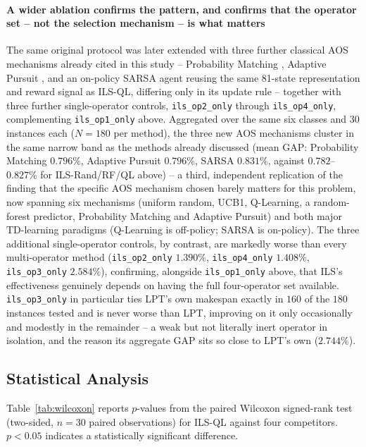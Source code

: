 \documentclass[final,3p,times,11pt,authoryear]{elsarticle}
\begin{document}
\paragraph{A wider ablation confirms the pattern, and confirms that
the operator set -- not the selection mechanism -- is what matters}
The same original protocol was later extended with three further
classical AOS mechanisms already cited in this study -- Probability
Matching \citep{Davis1989}, Adaptive Pursuit \citep{Thierens2005}, and
an on-policy SARSA agent \citep{RummeryNiranjan1994} reusing the same
81-state representation and reward signal as ILS-QL, differing only
in its update rule -- together with three further single-operator
controls, \texttt{ils\_op2\_only} through \texttt{ils\_op4\_only},
complementing \texttt{ils\_op1\_only} above. Aggregated over the same
six classes and 30 instances each ($N=180$ per method), the three new
AOS mechanisms cluster in the same narrow band as the methods already
discussed (mean GAP: Probability Matching $0.796\%$, Adaptive Pursuit
$0.796\%$, SARSA $0.831\%$, against $0.782$--$0.827\%$ for
ILS-Rand/RF/QL above) -- a third, independent replication of the
finding that the specific AOS mechanism chosen barely matters for
this problem, now spanning six mechanisms (uniform random, UCB1,
Q-Learning, a random-forest predictor, Probability Matching and
Adaptive Pursuit) and both major TD-learning paradigms (Q-Learning is
off-policy; SARSA is on-policy). The three additional single-operator
controls, by contrast, are markedly worse than every multi-operator
method (\texttt{ils\_op2\_only} $1.390\%$, \texttt{ils\_op4\_only}
$1.408\%$, \texttt{ils\_op3\_only} $2.584\%$), confirming, alongside
\texttt{ils\_op1\_only} above, that ILS's effectiveness genuinely
depends on having the full four-operator set available.
\texttt{ils\_op3\_only} in particular ties LPT's own makespan exactly
in $160$ of the $180$ instances tested and is never worse than LPT,
improving on it only occasionally and modestly in the remainder -- a
weak but not literally inert operator in isolation, and the reason
its aggregate GAP sits so close to LPT's own ($2.744\%$).

\subsection{Statistical Analysis}
\label{sec:stats}

Table~\ref{tab:wilcoxon} reports $p$-values from the paired Wilcoxon
signed-rank test (two-sided, $n{=}30$ paired observations) for ILS-QL
against four competitors. $p<0.05$ indicates a statistically
significant difference.
\end{document}
